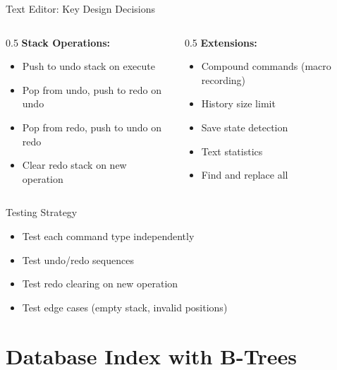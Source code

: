 \documentclass[aspectratio=169,xcolor=dvipsnames]{beamer}
\begin{document}
\begin{frame}{Text Editor: Key Design Decisions}
  \begin{columns}
    \begin{column}{0.5\textwidth}
      \textbf{Stack Operations:}
      \begin{itemize}
        \item Push to undo stack on execute
        \item Pop from undo, push to redo on undo
        \item Pop from redo, push to undo on redo
        \item Clear redo stack on new operation
      \end{itemize}
    \end{column}

    \begin{column}{0.5\textwidth}
      \textbf{Extensions:}
      \begin{itemize}
        \item Compound commands (macro recording)
        \item History size limit
        \item Save state detection
        \item Text statistics
        \item Find and replace all
      \end{itemize}
    \end{column}
  \end{columns}

  \vspace{0.3cm}
  \begin{block}{Testing Strategy}
    \begin{itemize}
      \item Test each command type independently
      \item Test undo/redo sequences
      \item Test redo clearing on new operation
      \item Test edge cases (empty stack, invalid positions)
    \end{itemize}
  \end{block}
\end{frame}

\section{Database Index with B-Trees}
\end{document}
